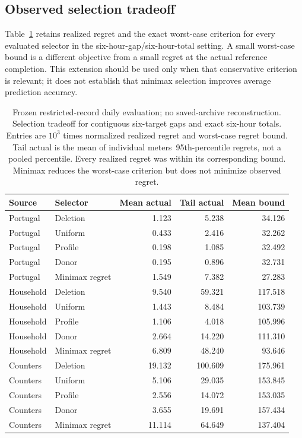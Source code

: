 \documentclass[12pt]{article}
\begin{document}
\subsection{Observed selection tradeoff}
Table~\ref{tab:regret} retains realized regret and the exact worst-case
criterion for every evaluated selector in the six-hour-gap/six-hour-total
setting. A small worst-case bound is a different objective from a small
regret at the actual reference completion. This extension should be used
only when that conservative criterion is relevant; it does not establish
that minimax selection improves average prediction accuracy.
\begin{table}[htbp]
\centering\normalsize\setlength{\tabcolsep}{4pt}
\caption{Frozen restricted-record daily evaluation; no saved-archive reconstruction. Selection tradeoff for contiguous six-target gaps and exact six-hour totals. Entries are $10^3$ times normalized realized regret and worst-case regret bound. Tail actual is the mean of individual meters\textquotesingle\ 95th-percentile regrets, not a pooled percentile. Every realized regret was within its corresponding bound. Minimax reduces the worst-case criterion but does not minimize observed regret.}
\label{tab:regret}
\begin{tabular}{llrrr}
\toprule
Source & Selector & Mean actual & Tail actual & Mean bound\\
\midrule
Portugal & Deletion & 1.123 & 5.238 & 34.126\\
Portugal & Uniform & 0.433 & 2.416 & 32.262\\
Portugal & Profile & 0.198 & 1.085 & 32.492\\
Portugal & Donor & 0.195 & 0.896 & 32.731\\
Portugal & Minimax regret & 1.549 & 7.382 & 27.283\\
Household & Deletion & 9.540 & 59.321 & 117.518\\
Household & Uniform & 1.443 & 8.484 & 103.739\\
Household & Profile & 1.106 & 4.018 & 105.996\\
Household & Donor & 2.664 & 14.220 & 111.310\\
Household & Minimax regret & 6.809 & 48.240 & 93.646\\
Counters & Deletion & 19.132 & 100.609 & 175.961\\
Counters & Uniform & 5.106 & 29.035 & 153.845\\
Counters & Profile & 2.556 & 14.072 & 153.035\\
Counters & Donor & 3.655 & 19.691 & 157.434\\
Counters & Minimax regret & 11.114 & 64.649 & 137.404\\
\bottomrule
\end{tabular}
\end{table}
\end{document}
